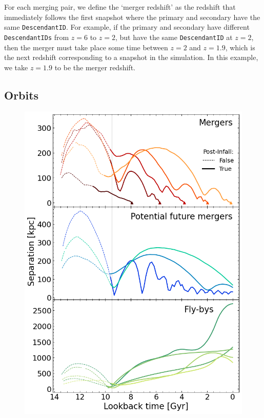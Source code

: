 \documentclass[twocolumn,linenumbers]{aastex631}
\begin{document}
For each merging pair, we define the `merger redshift' as the redshift that immediately follows the first snapshot where the primary and secondary have the same \texttt{DescendantID}. 
For example, if the primary and secondary have different \texttt{DescendantIDs} from $z=6$ to $z=2$, but have the same \texttt{DescendantID} at $z=2$, then the merger must take place some time between $z=2$ and $z=1.9$, which is the next redshift corresponding to a snapshot in the simulation. 
In this example, we take $z=1.9$ to be the merger redshift. 

\subsection{Orbits} 
\begin{figure}[tb]
    \begin{center}
    \includegraphics[width=\columnwidth]{plots/bet-on-it/5_exampleorbits.png}

\end{center}
\end{figure}
\end{document}
